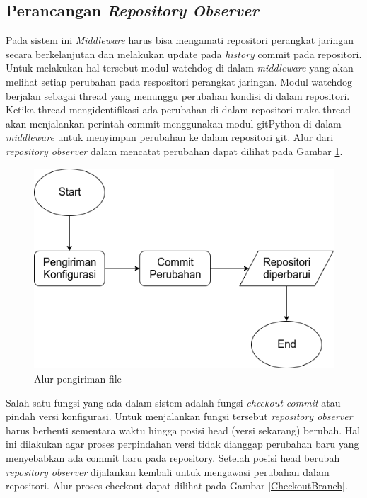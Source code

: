         \subsection{Perancangan \textit{Repository Observer}}
            Pada sistem ini \textit{Middleware} harus bisa mengamati repositori perangkat jaringan secara berkelanjutan dan melakukan update pada \textit{history} commit pada repositori. Untuk melakukan hal tersebut modul watchdog di dalam \textit{middleware} yang akan melihat setiap perubahan pada respositori perangkat jaringan. Modul watchdog berjalan sebagai thread yang menunggu perubahan kondisi di dalam repositori. Ketika thread mengidentifikasi ada perubahan di dalam repositori maka thread akan menjalankan perintah commit menggunakan modul gitPython di dalam \textit{middleware} untuk menyimpan perubahan ke dalam repositori git. Alur dari \textit{repository observer} dalam mencatat perubahan dapat dilihat pada Gambar \ref{desain_pengirimanfile}.
            \begin{figure}[H]
            	\centering
            	\includegraphics[width=\textwidth]{Images/C-3/AlurPengirimanFile.png}
            	\caption{Alur pengiriman file}
            	\label{desain_pengirimanfile}
            \end{figure}
        	\indent Salah satu fungsi yang ada dalam sistem adalah fungsi \textit{checkout commit} atau pindah versi konfigurasi. Untuk menjalankan fungsi tersebut \textit{repository observer} harus berhenti sementara waktu hingga posisi head (versi sekarang) berubah. Hal ini dilakukan agar proses perpindahan versi tidak dianggap perubahan baru yang menyebabkan ada commit baru pada repository. Setelah posisi head berubah \textit{repository observer} dijalankan kembali untuk mengawasi perubahan dalam repositori.  Alur proses checkout dapat dilihat pada Gambar \ref{CheckoutBranch}.
